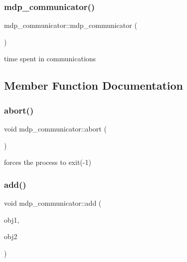 \subsubsection{\texorpdfstring{mdp\+\_\+communicator()}{mdp\_communicator()}}
{\footnotesize\ttfamily mdp\+\_\+communicator\+::mdp\+\_\+communicator (\begin{DoxyParamCaption}{ }\end{DoxyParamCaption})\hspace{0.3cm}{\ttfamily [inline]}}



time spent in communications 



\subsection{Member Function Documentation}
\mbox{\label{classmdp__communicator_aa601b7788f242a7f71b955a6bdf7e002}} 
\subsubsection{\texorpdfstring{abort()}{abort()}}
{\footnotesize\ttfamily void mdp\+\_\+communicator\+::abort (\begin{DoxyParamCaption}{ }\end{DoxyParamCaption})\hspace{0.3cm}{\ttfamily [inline]}}



forces the process to exit(-\/1) 

\mbox{\label{classmdp__communicator_a59576e470c0eb7c0b5faa177cc90c54b}} 
\subsubsection{\texorpdfstring{add()}{add()}\hspace{0.1cm}{\footnotesize\ttfamily [1/15]}}
{\footnotesize\ttfamily void mdp\+\_\+communicator\+::add (\begin{DoxyParamCaption}\item[{float \&}]{obj1,  }\item[{float \&}]{obj2 }\end{DoxyParamCaption})\hspace{0.3cm}{\ttfamily [inline]}}

